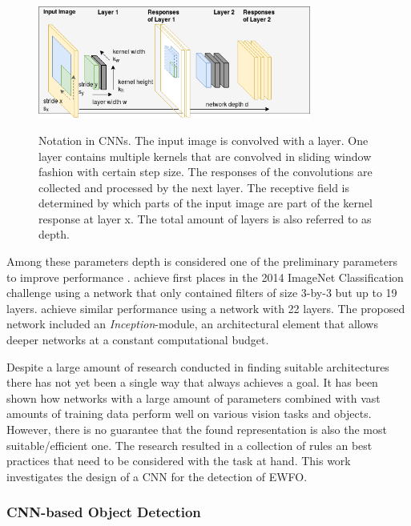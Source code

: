 \begin{figure}[hbtp]
	\centering
	\includegraphics[width=0.8\textwidth]{fig/model_design}
	\label{fig:model_design}
	\caption{Notation in \acp{CNN}. The input image is convolved with a layer. One layer contains multiple kernels that are convolved in sliding window fashion with certain step size. The responses of the convolutions are collected and processed by the next layer. The receptive field is determined by which parts of the input image are part of the kernel response at layer x. The total amount of layers is also referred to as depth.}
\end{figure}

Among these parameters depth is considered one of the preliminary parameters to improve performance \cite{He}. \citeauthor{Simonyan2014} \cite{Simonyan2014} achieve first places in the 2014 ImageNet Classification challenge using a network that only contained filters of size 3-by-3 but up to 19 layers. \citeauthor{Szegedy2014} \cite{Szegedy2014} achieve similar performance using a network with 22 layers. The proposed network included an \textit{Inception}-module, an architectural element that allows deeper networks at a constant computational budget. 

Despite a large amount of research conducted in finding suitable architectures there has not yet been a single way that always achieves a goal. It has been shown how networks with a large amount of parameters combined with vast amounts of training data perform well on various vision tasks and objects. However, there is no guarantee that the found representation is also the most suitable/efficient one. The research resulted in a collection of rules an best practices that need to be considered with the task at hand. This work investigates the design of a \ac{CNN} for the detection of \ac{EWFO}.

\subsubsection{\ac{CNN}-based Object Detection}

